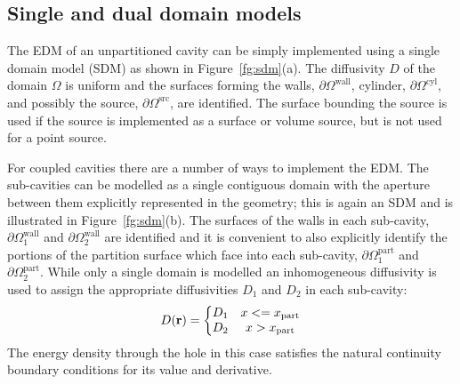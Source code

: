 \documentclass[a4paper]{article}
\numberwithin{equation}{section}
\newcounter{Figure}
\begin{document}
\subsection[Single and dual domain models]{Single and dual domain models}
\label{sc:tcs:sddm}

The EDM of an unpartitioned cavity can be simply implemented using a single domain model (SDM)
as shown in Figure~\ref{fg:sdm}(a). The diffusivity $D$ of the domain $\Omega$ is uniform and
the surfaces forming the walls, $\partial\Omega^\mathrm{wall}$, cylinder, $\partial\Omega^\mathrm{cyl}$, and 
possibly the source, $\partial\Omega^\mathrm{src}$, are identified. The surface bounding the source is 
used if the source is implemented as a surface or volume source, but is not used for a point source.

For coupled cavities there are a number of ways to implement the EDM. The sub-cavities can
be modelled as a single contiguous domain with the aperture between them explicitly represented in 
the geometry; this is again an SDM and is illustrated in Figure~\ref{fg:sdm}(b). The surfaces
of the walls in each sub-cavity, $\partial\Omega^\mathrm{wall}_1$ and $\partial\Omega^\mathrm{wall}_2$ are identified
and it is convenient to also explicitly identify the portions of the partition surface which face into
each sub-cavity, $\partial\Omega^\mathrm{part}_1$ and $\partial\Omega^\mathrm{part}_2$. While only a single domain
is modelled an inhomogeneous diffusivity is used to assign the appropriate diffusivities $D_1$ and
$D_2$ in each sub-cavity:
\begin{align}
D(\boldsymbol{\mathrm{r}}) = \left\{ 
\begin{matrix}
D_1    &x <= x_\mathrm{part} \\
D_2    &x > x_\mathrm{part} 
\end{matrix}
\right.
\end{align}
The energy density through the hole in this case satisfies the natural continuity boundary conditions
for its value and derivative.
\end{document}
